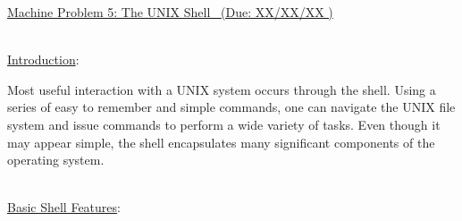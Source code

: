 \documentclass[12pt]{extarticle}
\newenvironment{myindentpar}[1]%
 {\begin{list}{}%
         {\setlength{\leftmargin}{#1}}%
         \item[]%
 }
 {\end{list}}
\newcommand{\duedate}{XX/XX/XX }
\begin{document}
\begin{center}
    \underline{{\large Machine Problem 5: The UNIX Shell \  }(Due: \duedate)}  \\
\end{center}

\ \\
{\large \underline{Introduction}:}

\begin{myindentpar}{5mm}

Most useful interaction with a UNIX system occurs through the shell.  Using a series of easy to remember and simple commands, one can navigate the UNIX file system and issue commands to perform a wide variety of tasks.  Even though it may appear simple, the shell encapsulates many significant components of the operating system.  

\end{myindentpar}

\ \\
{\large \underline{Basic Shell Features}:}
\end{document}
